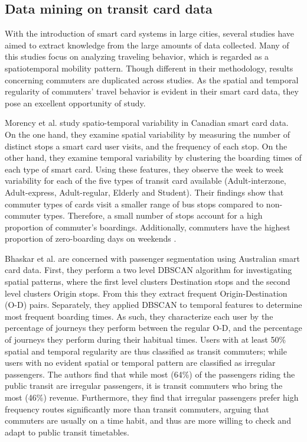 \documentclass{article}
\begin{document}
\subsection{Data mining on transit card data}
With the introduction of smart card systems in large cities, several studies have aimed to extract knowledge from the large amounts of data collected. Many of this studies focus on analyzing traveling behavior, which is regarded as a spatiotemporal mobility pattern. Though different in their methodology, results concerning commuters are duplicated across studies. As the spatial and temporal regularity of commuters' travel behavior is evident in their smart card data, they pose an excellent opportunity of study.

Morency et al. study spatio-temporal variability in Canadian smart card data. On the one hand, they examine spatial variability by measuring the number of distinct stops a smart card user visits, and the frequency of each stop. On the other hand, they examine temporal variability by clustering the boarding times of each type of smart card. Using these features, they observe the week to week variability for each of the five types of transit card available (Adult-interzone, Adult-express, Adult-regular, Elderly and Student). Their findings show that commuter types of cards visit a smaller range of bus stops compared to non-commuter types. Therefore, a small number of stops account for a high proportion of commuter's boardings. Additionally, commuters have the highest proportion of zero-boarding days on weekends \cite{morency2007measuring}.


Bhaskar et al. are concerned with passenger segmentation using Australian smart card data. First, they perform a two level DBSCAN algorithm for investigating spatial patterns, where the first level clusters Destination stops and the second level clusters Origin stops.  From this they extract frequent Origin-Destination (O-D) pairs. Separately, they applied DBSCAN to temporal features to determine most frequent boarding times.  As such, they characterize each user by the percentage of journeys they perform between the regular O-D, and the percentage of journeys they perform during their habitual times. Users with at least 50\% spatial and temporal regularity are thus classified as transit commuters; while users with no evident spatial or temporal pattern are classified as irregular passengers. The authors find that while most (64\%) of the passengers riding the public transit are irregular passengers, it is transit commuters who bring the most (46\%) revenue. Furthermore, they find that irregular passengers prefer high frequency routes significantly more than transit commuters, arguing that commuters are usually on a time habit, and thus are more willing to check and adapt to public transit timetables. \cite{bhaskar2015passenger}
\end{document}
